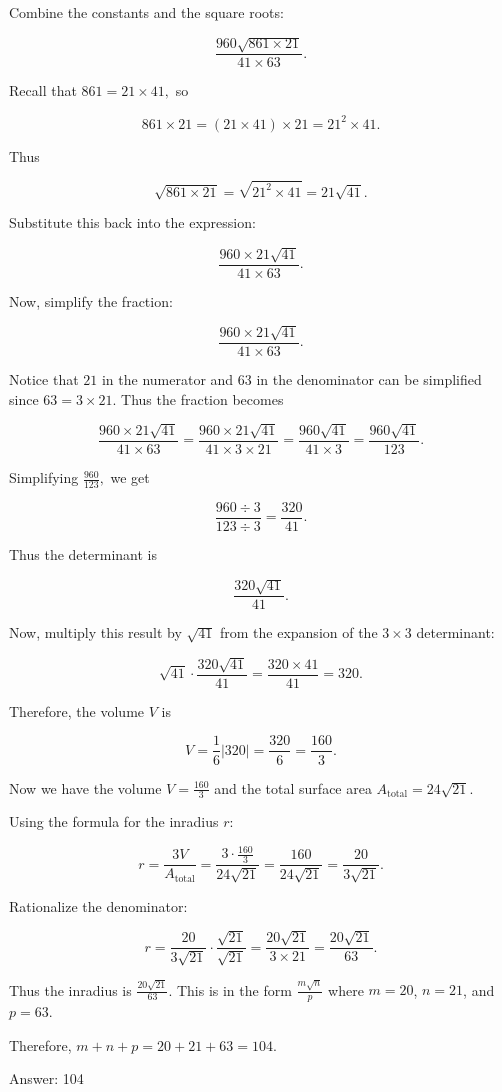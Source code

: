 Combine the constants and the square roots:

\[ \frac{960 \sqrt{861 \times 21}}{41 \times 63}. \]

Recall that $861 = 21 \times 41,$ so

\[ 861 \times 21 = (21 \times 41) \times 21 = 21^2 \times 41. \]

Thus 

\[ \sqrt{861 \times 21} = \sqrt{21^2 \times 41} = 21 \sqrt{41}. \]

Substitute this back into the expression:

\[ \frac{960 \times 21 \sqrt{41}}{41 \times 63}. \]

Now, simplify the fraction:

\[ \frac{960 \times 21 \sqrt{41}}{41 \times 63}. \]

Notice that $21$ in the numerator and $63$ in the denominator can be simplified since $63 = 3 \times 21$. Thus the fraction becomes

\[ \frac{960 \times 21 \sqrt{41}}{41 \times 63} = \frac{960 \times 21 \sqrt{41}}{41 \times 3 \times 21} = \frac{960 \sqrt{41}}{41 \times 3} = \frac{960 \sqrt{41}}{123}. \]

Simplifying $\frac{960}{123},$ we get

\[ \frac{960 \div 3}{123 \div 3} = \frac{320}{41}. \]

Thus the determinant is 

\[ \frac{320 \sqrt{41}}{41}. \]

Now, multiply this result by $\sqrt{41}$ from the expansion of the $3 \times 3$ determinant:

\[ \sqrt{41} \cdot \frac{320 \sqrt{41}}{41} = \frac{320 \times 41}{41} = 320. \]

Therefore, the volume $V$ is

\[ V = \frac{1}{6} \left| 320 \right| = \frac{320}{6} = \frac{160}{3}. \]

Now we have the volume $V = \frac{160}{3}$ and the total surface area $A_{\text{total}} = 24 \sqrt{21}$.

Using the formula for the inradius $r$:

\[ r = \frac{3V}{A_{\text{total}}} = \frac{3 \cdot \frac{160}{3}}{24 \sqrt{21}} = \frac{160}{24 \sqrt{21}} = \frac{20}{3 \sqrt{21}}. \]

Rationalize the denominator:

\[ r = \frac{20}{3 \sqrt{21}} \cdot \frac{\sqrt{21}}{\sqrt{21}} = \frac{20 \sqrt{21}}{3 \times 21} = \frac{20 \sqrt{21}}{63}. \]

Thus the inradius is $\frac{20 \sqrt{21}}{63}$. This is in the form $\frac{m \sqrt{n}}{p}$ where $m = 20$, $n = 21$, and $p = 63$. 

Therefore, $m + n + p = 20 + 21 + 63 = 104$.

Answer: 104



